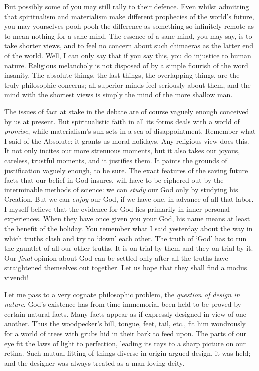 \documentclass[]{article}
\begin{document}
But possibly some of you may still rally to their defence. Even whilst admitting that spiritualism and materialism make different prophecies of the world's future, you may yourselves pooh-pooh the difference as something so infinitely remote as to mean nothing for a sane mind. The essence of a sane mind, you may say, is to take shorter views, and to feel no concern about such chimaeras as the latter end of the world. Well, I can only say that if you say this, you do injustice to human nature. Religious melancholy is not disposed of by a simple flourish of the word insanity. The absolute things, the last things, the overlapping things, are the truly philosophic concerns; all superior minds feel seriously about them, and the mind with the shortest views is simply the mind of the more shallow man.

The issues of fact at stake in the debate are of course vaguely enough conceived by us at present. But spiritualistic faith in all its forms deals with a world of \emph{promise}, while materialism's sun sets in a sea of disappointment. Remember what I said of the Absolute: it grants us moral holidays. Any religious view does this. It not only incites our more strenuous moments, but it also takes our joyous, careless, trustful moments, and it justifies them. It paints the grounds of justification vaguely enough, to be sure. The exact features of the saving future facts that our belief in God insures, will have to be ciphered out by the interminable methods of science: we can \emph{study} our God only by studying his Creation. But we can \emph{enjoy} our God, if we have one, in advance of all that labor. I myself believe that the evidence for God lies primarily in inner personal experiences. When they have once given you your God, his name means at least the benefit of the holiday. You remember what I said yesterday about the way in which truths clash and try to `down' each other. The truth of `God' has to run the gauntlet of all our other truths. It is on trial by them and they on trial by it. Our \emph{final} opinion about God can be settled only after all the truths have straightened themselves out together. Let us hope that they shall find a modus vivendi!

Let me pass to a very cognate philosophic problem, the \emph{question of design in nature}. God's existence has from time immemorial been held to be proved by certain natural facts. Many facts appear as if expressly designed in view of one another. Thus the woodpecker's bill, tongue, feet, tail, etc., fit him wondrously for a world of trees with grubs hid in their bark to feed upon. The parts of our eye fit the laws of light to perfection, leading its rays to a sharp picture on our retina. Such mutual fitting of things diverse in origin argued design, it was held; and the designer was always treated as a man-loving deity.
\end{document}
